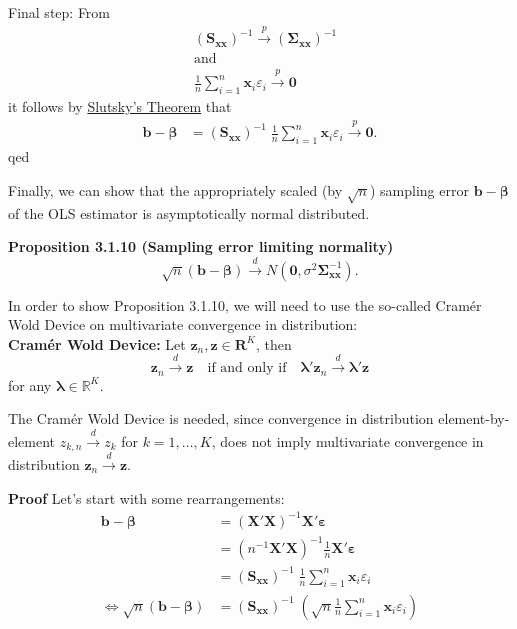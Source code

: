 \documentclass[
]{book}
\begin{document}
Final step: From
\begin{align*}
&\left(\mathbf{S}_{\mathbf{x}\mathbf{x}}\right)^{-1}\overset{p}\longrightarrow\left(\boldsymbol{\Sigma}_{\mathbf{x}\mathbf{x}}\right)^{-1}\\
&\text{and}\\
&\frac{1}{n}\sum_{i=1}^n\mathbf{x}_i\varepsilon_i\overset{p}\longrightarrow\mathbf{0}
\end{align*}
it follows by \href{https://www.statlect.com/asymptotic-theory/Slutsky-theorem}{Slutsky's Theorem}
that
\begin{align*}
\mathbf{b}-\boldsymbol{\beta}
&=\left(\mathbf{S}_{\mathbf{x}\mathbf{x}}\right)^{-1}\;\frac{1}{n}\sum_{i=1}^n\mathbf{x}_i\varepsilon_i\overset{p}\longrightarrow \mathbf{0}.
\end{align*}
qed

\hfill\break

Finally, we can show that the appropriately scaled (by \(\sqrt{n}\))
sampling error \(\mathbf{b}-\boldsymbol{\beta}\) of the OLS estimator is asymptotically
normal distributed.

\textbf{Proposition 3.1.10 (Sampling error limiting normality)}
\[\sqrt{n}(\mathbf{b}-\boldsymbol{\beta})\overset{d}\longrightarrow N(\mathbf{0},\sigma^2 \boldsymbol{\Sigma}^{-1}_{\mathbf{x}\mathbf{x}}).\]

In order to show Proposition 3.1.10, we will need to use the so-called Cramér
Wold Device on multivariate convergence in distribution:\\

\textbf{Cramér Wold Device:} Let \(\mathbf{z}_n,\mathbf{z}\in\mathbf{R}^K\),
then\\
\[\mathbf{z}_n\overset{d}\longrightarrow \mathbf{z} \quad \text{if and only if} \quad \boldsymbol{\lambda}'\mathbf{z}_n\overset{d}\longrightarrow \boldsymbol{\lambda}'\mathbf{z}\]
for any \(\boldsymbol{\lambda}\in\mathbb{R}^K\).

The Cramér Wold Device is needed, since convergence in distribution element-by-element \(z_{k,n}\overset{d}\longrightarrow z_k\) for \(k=1,\dots,K\), does not imply multivariate convergence in distribution \(\mathbf{z}_n\overset{d}\longrightarrow \mathbf{z}\).

\textbf{Proof}
Let's start with some rearrangements:
\begin{align*}
\mathbf{b}-\boldsymbol{\beta}
&=(\mathbf{X}'\mathbf{X})^{-1}\mathbf{X}'\boldsymbol{\varepsilon}\\
&=(n^{-1}\mathbf{X}'\mathbf{X})^{-1}\frac{1}{n}\mathbf{X}'\boldsymbol{\varepsilon}\\
&=\left(\mathbf{S}_{\mathbf{x}\mathbf{x}}\right)^{-1}\;\frac{1}{n}\sum_{i=1}^n\mathbf{x}_i\varepsilon_i\\
\Leftrightarrow\sqrt{n}(\mathbf{b}-\boldsymbol{\beta})&=\left(\mathbf{S}_{\mathbf{x}\mathbf{x}}\right)^{-1}\;\left(\sqrt{n}\frac{1}{n}\sum_{i=1}^n\mathbf{x}_i\varepsilon_i\right)
\end{align*}
\end{document}
